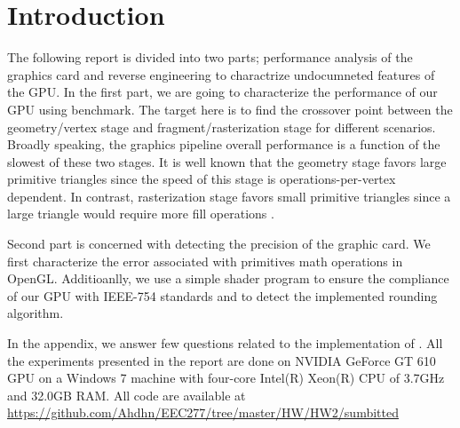 \section{Introduction}
The following report is divided into two parts; performance analysis of the graphics card and reverse engineering to charactrize undocumneted features of the GPU. In the first part, we are going to characterize the performance of our GPU using \protect{\wes} benchmark. The target here is to find the crossover point between the geometry/vertex stage and fragment/rasterization stage for different scenarios. Broadly speaking, the graphics pipeline overall performance is a function of the slowest of these two stages. It is well known that the geometry stage favors large primitive triangles since the speed of this stage is operations-per-vertex dependent. In contrast, rasterization stage favors small primitive triangles since a large triangle would require more fill operations \cite{Bethel_2010}.

Second part is concerned with detecting the precision of the graphic card. We first characterize the error associated with primitives math operations in OpenGL. Additioanlly, we use a simple shader program to ensure the compliance of our GPU with IEEE-754 standards and to detect the  implemented rounding algorithm. 

In the appendix, we answer few questions related to the implementation of \protect{\wes}. All the experiments presented in the report are done on NVIDIA GeForce GT 610 GPU on a Windows 7 machine with four-core Intel(R) Xeon(R) CPU of 3.7GHz and 32.0GB RAM.  All code are available at \url{https://github.com/Ahdhn/EEC277/tree/master/HW/HW2/sumbitted} 

